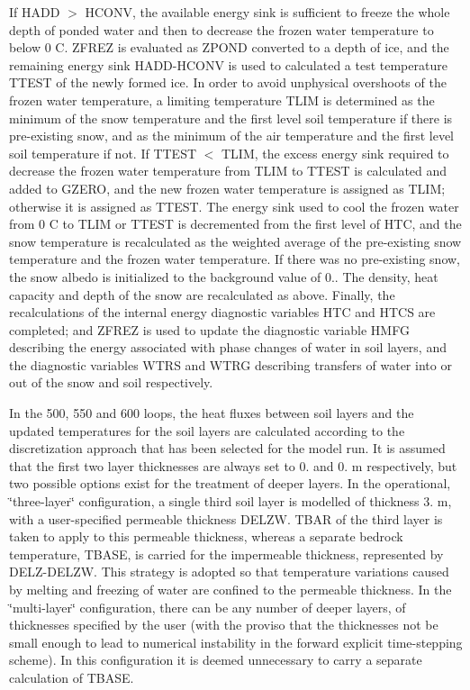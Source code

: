 If H\+A\+D\+D $>$ H\+C\+O\+N\+V, the available energy sink is sufficient to freeze the whole depth of ponded water and then to decrease the frozen water temperature to below 0 C. Z\+F\+R\+E\+Z is evaluated as Z\+P\+O\+N\+D converted to a depth of ice, and the remaining energy sink H\+A\+D\+D-\/\+H\+C\+O\+N\+V is used to calculated a test temperature T\+T\+E\+S\+T of the newly formed ice. In order to avoid unphysical overshoots of the frozen water temperature, a limiting temperature T\+L\+I\+M is determined as the minimum of the snow temperature and the first level soil temperature if there is pre-\/existing snow, and as the minimum of the air temperature and the first level soil temperature if not. If T\+T\+E\+S\+T $<$ T\+L\+I\+M, the excess energy sink required to decrease the frozen water temperature from T\+L\+I\+M to T\+T\+E\+S\+T is calculated and added to G\+Z\+E\+R\+O, and the new frozen water temperature is assigned as T\+L\+I\+M; otherwise it is assigned as T\+T\+E\+S\+T. The energy sink used to cool the frozen water from 0 C to T\+L\+I\+M or T\+T\+E\+S\+T is decremented from the first level of H\+T\+C, and the snow temperature is recalculated as the weighted average of the pre-\/existing snow temperature and the frozen water temperature. If there was no pre-\/existing snow, the snow albedo is initialized to the background value of 0.. The density, heat capacity and depth of the snow are recalculated as above. Finally, the recalculations of the internal energy diagnostic variables H\+T\+C and H\+T\+C\+S are completed; and Z\+F\+R\+E\+Z is used to update the diagnostic variable H\+M\+F\+G describing the energy associated with phase changes of water in soil layers, and the diagnostic variables W\+T\+R\+S and W\+T\+R\+G describing transfers of water into or out of the snow and soil respectively.

In the 500, 550 and 600 loops, the heat fluxes between soil layers and the updated temperatures for the soil layers are calculated according to the discretization approach that has been selected for the model run. It is assumed that the first two layer thicknesses are always set to 0. and 0. m respectively, but two possible options exist for the treatment of deeper layers. In the operational, \char`\"{}three-\/layer\char`\"{} configuration, a single third soil layer is modelled of thickness 3. m, with a user-\/specified permeable thickness D\+E\+L\+Z\+W. T\+B\+A\+R of the third layer is taken to apply to this permeable thickness, whereas a separate bedrock temperature, T\+B\+A\+S\+E, is carried for the impermeable thickness, represented by D\+E\+L\+Z-\/\+D\+E\+L\+Z\+W. This strategy is adopted so that temperature variations caused by melting and freezing of water are confined to the permeable thickness. In the \char`\"{}multi-\/layer\char`\"{} configuration, there can be any number of deeper layers, of thicknesses specified by the user (with the proviso that the thicknesses not be small enough to lead to numerical instability in the forward explicit time-\/stepping scheme). In this configuration it is deemed unnecessary to carry a separate calculation of T\+B\+A\+S\+E.

